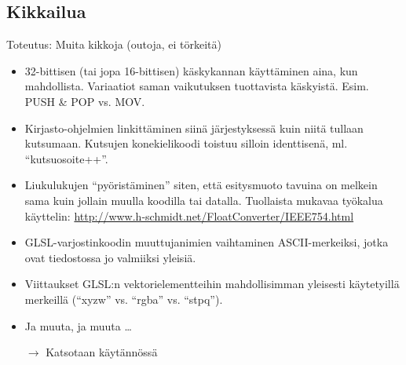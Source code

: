 \documentclass[pdf,10pt,handout]{beamer}
\begin{document}
\subsection{Kikkailua}
\begin{frame}{Toteutus: Muita kikkoja (outoja, ei törkeitä)}
  \begin{itemize}
  \item 32-bittisen (tai jopa 16-bittisen) käskykannan käyttäminen
    aina, kun mahdollista. Variaatiot saman vaikutuksen tuottavista
    käskyistä. Esim. PUSH \& POP vs. MOV.
  \item Kirjasto-ohjelmien linkittäminen siinä järjestyksessä kuin
    niitä tullaan kutsumaan. Kutsujen konekielikoodi toistuu silloin
    identtisenä, ml. ``kutsuosoite++''.
  \item Liukulukujen ``pyöristäminen'' siten, että esitysmuoto tavuina
    on melkein sama kuin jollain muulla koodilla tai
    datalla. Tuollaista mukavaa työkalua käyttelin:
    \url{http://www.h-schmidt.net/FloatConverter/IEEE754.html}
  \item GLSL-varjostinkoodin muuttujanimien vaihtaminen
    ASCII-merkeiksi, jotka ovat tiedostossa jo valmiiksi yleisiä.
  \item Viittaukset GLSL:n vektorielementteihin mahdollisimman
    yleisesti käytetyillä merkeillä (``xyzw'' vs. ``rgba''
    vs. ``stpq'').
  \item Ja muuta, ja muuta \ldots
  \item[$\rightarrow$] Katsotaan käytännössä
  \end{itemize}
\end{frame}
\end{document}
